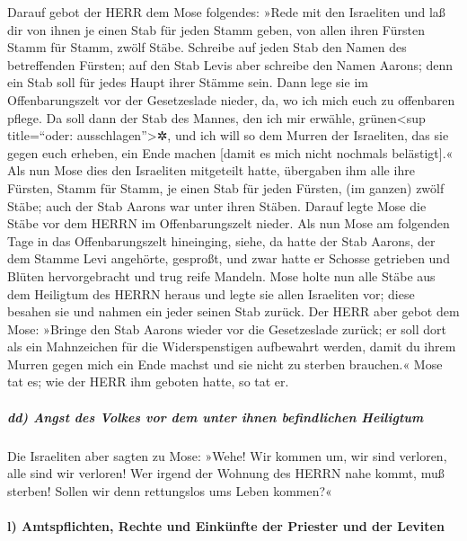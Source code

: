 Darauf gebot der HERR dem Mose folgendes:
»Rede mit den Israeliten und laß dir von ihnen je einen
Stab für jeden Stamm geben, von allen ihren Fürsten Stamm für Stamm,
zwölf Stäbe. Schreibe auf jeden Stab den Namen des betreffenden Fürsten;
auf den Stab Levis aber schreibe den Namen Aarons; denn
ein Stab soll für jedes Haupt ihrer Stämme sein. Dann
lege sie im Offenbarungszelt vor der Gesetzeslade nieder, da, wo ich
mich euch zu offenbaren pflege. Da soll dann der Stab des
Mannes, den ich mir erwähle, grünen\textless sup title=``oder:
ausschlagen''\textgreater✲, und ich will so dem Murren der Israeliten,
das sie gegen euch erheben, ein Ende machen {[}damit es mich nicht
nochmals belästigt{]}.« Als nun Mose dies den Israeliten
mitgeteilt hatte, übergaben ihm alle ihre Fürsten, Stamm für Stamm, je
einen Stab für jeden Fürsten, (im ganzen) zwölf Stäbe; auch der Stab
Aarons war unter ihren Stäben. Darauf legte Mose die
Stäbe vor dem HERRN im Offenbarungszelt nieder. Als nun
Mose am folgenden Tage in das Offenbarungszelt hineinging, siehe, da
hatte der Stab Aarons, der dem Stamme Levi angehörte, gesproßt, und zwar
hatte er Schosse getrieben und Blüten hervorgebracht und trug reife
Mandeln. Mose holte nun alle Stäbe aus dem Heiligtum des
HERRN heraus und legte sie allen Israeliten vor; diese besahen sie und
nahmen ein jeder seinen Stab zurück. Der HERR aber gebot
dem Mose: »Bringe den Stab Aarons wieder vor die Gesetzeslade zurück; er
soll dort als ein Mahnzeichen für die Widerspenstigen aufbewahrt werden,
damit du ihrem Murren gegen mich ein Ende machst und sie nicht zu
sterben brauchen.« Mose tat es; wie der HERR ihm geboten
hatte, so tat er.

\hypertarget{dd-angst-des-volkes-vor-dem-unter-ihnen-befindlichen-heiligtum}{%
\subparagraph{dd) Angst des Volkes vor dem unter ihnen befindlichen
Heiligtum}\label{dd-angst-des-volkes-vor-dem-unter-ihnen-befindlichen-heiligtum}}

Die Israeliten aber sagten zu Mose: »Wehe! Wir kommen um,
wir sind verloren, alle sind wir verloren! Wer irgend der
Wohnung des HERRN nahe kommt, muß sterben! Sollen wir denn rettungslos
ums Leben kommen?«

\hypertarget{l-amtspflichten-rechte-und-einkuxfcnfte-der-priester-und-der-leviten}{%
\paragraph{l) Amtspflichten, Rechte und Einkünfte der Priester und der
Leviten}\label{l-amtspflichten-rechte-und-einkuxfcnfte-der-priester-und-der-leviten}}

